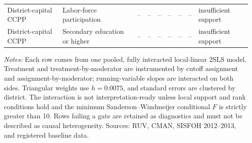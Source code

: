 \begin{table}[!htbp]
{\begin{tabular}{llrrrrrrl}
District-capital CCPP & Labor-force participation & -- & -- & -- & -- & -- & -- & insufficient support \\
District-capital CCPP & Secondary education or higher & -- & -- & -- & -- & -- & -- & insufficient support \\
\bottomrule
\end{tabular}}
\parbox{0.97\linewidth}{\footnotesize \textit{Notes:} Each row comes from one pooled, fully interacted local-linear 2SLS model. Treatment and treatment-by-moderator are instrumented by cutoff assignment and assignment-by-moderator; running-variable slopes are interacted on both sides. Triangular weights use \(h=0.0075\), and standard errors are clustered by district. The interaction is not interpretation-ready unless local support and rank conditions hold and the minimum Sanderson--Windmeijer conditional \(F\) is strictly greater than 10. Rows failing a gate are retained as diagnostics and must not be described as causal heterogeneity. Sources: RUV, CMAN, SISFOH 2012--2013, and registered baseline data.}
\end{table}
